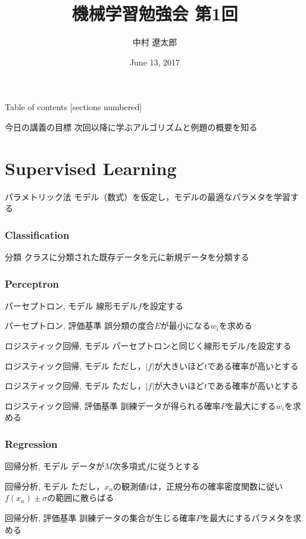 \documentclass[dvipdfmx,platex]{beamer}
\title{{\mgfamily 機械学習勉強会 第1回}}
\date{June 13, 2017}
\author{{\mgfamily 中村 遼太郎}}
\institute{}
\begin{document}
\mgfamily
\maketitle
\begin{frame}{Table of contents}
  [sections numbered]
  \tableofcontents[part=1]
\end{frame}

\begin{frame}[fragile]{{\mgfamily 今日の講義の目標}}
次回以降に学ぶアルゴリズムと例題の概要を知る
\end{frame}
\part{Supervised Learning}
\begin{frame}{パラメトリック法}
  モデル（数式）を仮定し，モデルの最適なパラメタを学習する
\end{frame}
\section{Classification}
\begin{frame}{分類}
  クラスに分類された既存データを元に新規データを分類する
\end{frame}
\section{Perceptron}
\begin{frame}{パーセプトロン, モデル}
  線形モデル$f$を設定する
\end{frame}
\begin{frame}{パーセプトロン, 評価基準}
  誤分類の度合$E$が最小になる$w_i$を求める
\end{frame}
\begin{frame}{ロジスティック回帰, モデル}
  パーセプトロンと同じく線形モデル$f$を設定する
\end{frame}
\begin{frame}{ロジスティック回帰, モデル}
  ただし，$|f|$が大きいほど$t$である確率が高いとする
\end{frame}
\begin{frame}{ロジスティック回帰, モデル}
  ただし，$|f|$が大きいほど$t$である確率が高いとする
\end{frame}
\begin{frame}{ロジスティック回帰, 評価基準}
  訓練データが得られる確率$P$を最大にする$w_i$を求める
\end{frame}
\section{Regression}
\begin{frame}{回帰分析, モデル}
  データが$M$次多項式$f$に従うとする
\end{frame}
\begin{frame}{回帰分析, モデル}
  ただし，$x_n$の観測値$t$は，正規分布の確率密度関数に従い$f(x_n)\pm\sigma$の範囲に散らばる  
\end{frame}
\begin{frame}{回帰分析, 評価基準}
  訓練データの集合が生じる確率$P$を最大にするパラメタを求める
\end{frame}
\end{document}
